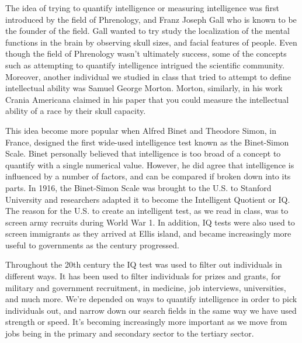 \documentclass[11pt, oneside]{article}
\begin{document}

\par The idea of trying to quantify intelligence or measuring intelligence was first introduced by the field of Phrenology, and Franz Joseph Gall who is known to be the founder of the field. Gall wanted to try study the localization of the mental functions in the brain by observing skull sizes, and facial features of people. Even though the field of Phrenology wasn't ultimately success, some of the concepts such as attempting to quantify intelligence intrigued the scientific community. Moreover, another individual we studied in class that tried to attempt to define intellectual ability was Samuel George Morton. Morton, similarly, in his work Crania Americana claimed in his paper that you could measure the intellectual ability of a race by their skull capacity. 

\par This idea become more popular when Alfred Binet and Theodore Simon, in France, designed the first wide-used intelligence test known as the Binet-Simon Scale. Binet personally believed that intelligence is too broad of a concept to quantify with a single numerical value. However, he did agree that intelligence is influenced by a number of factors, and can be compared if broken down into its parts. In 1916, the Binet-Simon Scale was brought to the U.S. to Stanford University and researchers adapted it to become the Intelligent Quotient or IQ. The reason for the U.S. to create an intelligent test, as we read in class, was to screen army recruits during World War 1. In addition, IQ tests were also used to screen immigrants as they arrived at Ellis island, and became increasingly more useful to governments as the century progressed. 

\par Throughout the 20th century the IQ test was used to filter out individuals in different ways. It has been used to filter individuals for prizes and grants, for military and government recruitment, in medicine, job interviews, universities, and much more. We're depended on ways to quantify intelligence in order to pick individuals out, and narrow down our search fields in the same way we have used strength or speed. It's becoming increasingly more important as we move from jobs being in the primary and secondary sector to the tertiary sector. 
\end{document}
